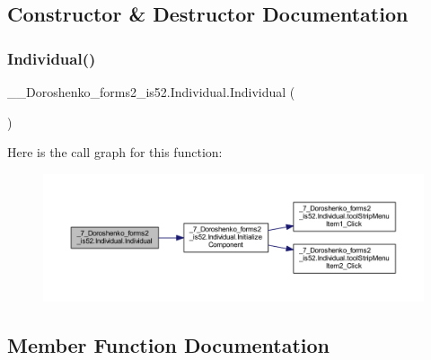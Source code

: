 \subsection{Constructor \& Destructor Documentation}
\hypertarget{class__7___doroshenko__forms2__is52_1_1_individual_a3911f629d8bd477180a7dfc86203fe37}{}\label{class__7___doroshenko__forms2__is52_1_1_individual_a3911f629d8bd477180a7dfc86203fe37} 
\subsubsection{\texorpdfstring{Individual()}{Individual()}}
{\footnotesize\ttfamily \+\_\+\_\+\+Doroshenko\+\_\+forms2\+\_\+is52.\+Individual.\+Individual (\begin{DoxyParamCaption}{ }\end{DoxyParamCaption})}

Here is the call graph for this function\+:
\nopagebreak
\begin{figure}[H]
\begin{center}
\leavevmode
\includegraphics[width=350pt]{class__7___doroshenko__forms2__is52_1_1_individual_a3911f629d8bd477180a7dfc86203fe37_cgraph}
\end{center}
\end{figure}


\subsection{Member Function Documentation}
\hypertarget{class__7___doroshenko__forms2__is52_1_1_individual_a1bd1c8c3cb0bee2054c7fd5c51402015}{}\label{class__7___doroshenko__forms2__is52_1_1_individual_a1bd1c8c3cb0bee2054c7fd5c51402015} 
